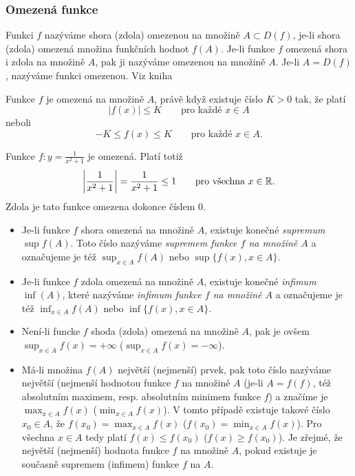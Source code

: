       \subsubsection{Omezená funkce}
        \begin{definition}\label{MA1:def_lim01}
          Funkci $f$ nazýváme shora (zdola) omezenou na množině $A\subset D(f)$, je-li shora (zdola) omezená 
          množina funkčních hodnot $f(A)$. Je-li funkce $f$ omezená shora i zdola na množině $A$, pak ji 
          nazýváme omezenou na množině $A$. Je-li $A=D(f)$, nazýváme funkci omezenou. Viz kniha 
          \cite[s.~87]{Brabec1989}       
        \end{definition}
        Funkce $f$ je omezená na množině $A$, právě když existuje číslo $K>0$ tak, že platí
        $$|f(x)|\leq K \qquad \text{pro každé } x\in A$$
        neboli
        $$-K\leq f(x) \leq K \qquad \text{pro každé } x\in A.$$
        \begin{example}\label{MAI:exam05}
          Funkce $f:y=\frac{1}{x^2+1}$ je omezená. Platí totiž $$\left|\frac{1}{x^2+1}\right|=\frac{1}{x^2+1}\leq1 \qquad \text{pro všechna }x\in\mathbb{R}.$$ Zdola
          je tato funkce omezena dokonce číslem $0$.  
        \end{example}
        \begin{itemize}
          \item Je-li funkce $f$ shora omezená na množině $A$, existuje konečné \emph{supremum} $\sup f(A)$. 
                Toto číslo nazýváme \emph{supremem funkce $f$ na množině $A$} a označujeme je též $\sup_{x\in 
                A}f(A)$ nebo $\sup\{f(x), x\in A\}$.
          \item Je-li funkce $f$ zdola omezená na množině $A$, existuje konečné \emph{infimum} $\inf(A)$,    
                které nazýváme \emph{infimum funkce $f$ na množině $A$} a označujeme je též $\inf_{x\in 
                A}f(A)$ nebo $\inf\{f(x), x\in A\}$. 
          \item Není-li funcke $f$ shoda (zdola) omezená na množině $A$, pak je ovšem $\sup_{x\in A}    
                f(x)=+\infty$ ($\sup_{x\in A} f(x)=-\infty$).
          \item Má-li množina $f(A)$ největší (nejmenší) prvek, pak toto číslo nazýváme největší 
                (nejmenší hodnotou funkce $f$  na množině $A$ (je-li $A = f(f)$, též absolutním maximem, 
                resp. absolutním minimem funkce $f$) a značíme je $\max_{x\in A} f(x)$ ($\min_{x\in A} 
                f(x)$). V tomto případě existuje takové číslo $x_0\in A$, že $f(x_0)=\max_{x\in A}f(x)$ 
                ($f(x_0)=\min_{x\in A}f(x)$). Pro všechna $x\in A$ tedy platí $f(x)\leq f(x_0)$ 
                ($f(x)\geq f(x_0)$). Je zřejmé, že největší (nejmenší) hodnota funkce $f$ na množině $A$, 
                pokud existuje je současně supremem (infimem) funkce $f$ na $A$.
        \end{itemize}
